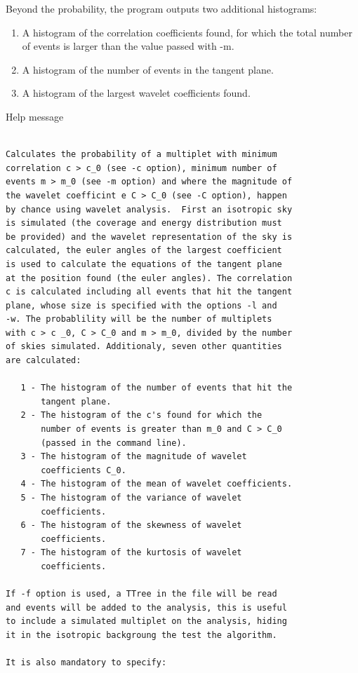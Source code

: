\documentclass[12pt]{article}
\begin{document}
Beyond the probability, the program outputs two additional histograms:
\begin{enumerate}
\item A histogram of the correlation coefficients found, for which the total number
of events is larger than the value passed with -m.
\item A histogram of the number of events in the tangent plane.
\item A histogram of the largest wavelet coefficients found.
\end{enumerate}

Help message

{\bf \color{textcolor}
\begin{lstlisting}

Calculates the probability of a multiplet with minimum
correlation c > c_0 (see -c option), minimum number of
events m > m_0 (see -m option) and where the magnitude of
the wavelet coefficint e C > C_0 (see -C option), happen
by chance using wavelet analysis.  First an isotropic sky
is simulated (the coverage and energy distribution must
be provided) and the wavelet representation of the sky is
calculated, the euler angles of the largest coefficient
is used to calculate the equations of the tangent plane
at the position found (the euler angles). The correlation
c is calculated including all events that hit the tangent
plane, whose size is specified with the options -l and
-w. The probablility will be the number of multiplets
with c > c _0, C > C_0 and m > m_0, divided by the number
of skies simulated. Additionaly, seven other quantities
are calculated:
   
   1 - The histogram of the number of events that hit the
       tangent plane.
   2 - The histogram of the c's found for which the
       number of events is greater than m_0 and C > C_0
       (passed in the command line).
   3 - The histogram of the magnitude of wavelet
       coefficients C_0.
   4 - The histogram of the mean of wavelet coefficients.
   5 - The histogram of the variance of wavelet
       coefficients.
   6 - The histogram of the skewness of wavelet
       coefficients.
   7 - The histogram of the kurtosis of wavelet
       coefficients.
   
If -f option is used, a TTree in the file will be read
and events will be added to the analysis, this is useful
to include a simulated multiplet on the analysis, hiding
it in the isotropic backgroung the test the algorithm.

It is also mandatory to specify:


\end{lstlisting}}
\end{document}
